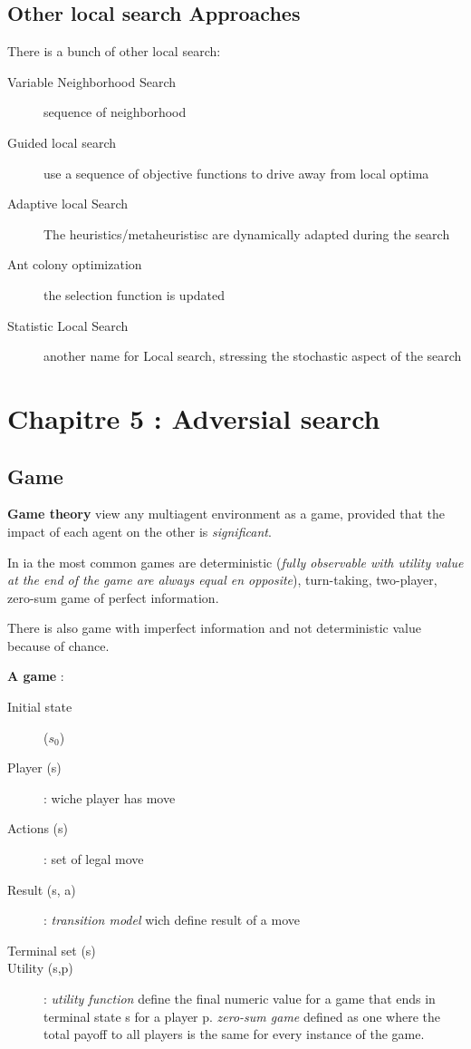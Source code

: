 \subsection{Other local search Approaches}

There is a bunch of other local search:
\begin{description}
    \item[Variable Neighborhood Search] sequence of neighborhood
    \item[Guided local search] use a sequence of objective functions to drive away from local optima
    \item[Adaptive local Search] The heuristics/metaheuristisc are dynamically adapted during the search
    \item[Ant colony optimization] the selection function is updated
    \item[Statistic Local Search] another name for Local search, stressing the stochastic aspect of the search
\end{description}



\section{Chapitre 5 : Adversial search}

\subsection{Game}

\textbf{Game theory} view any multiagent environment as a game, provided that
the impact of each agent on the other is \textit{significant}.

In ia the most common games are deterministic (\textit{fully observable with utility value at
the end of the game are always equal en opposite}), turn-taking, two-player, zero-sum game of
perfect information.

There is also game with imperfect information and not deterministic value because of chance.


\textbf{A game} :
\begin{description}
    \item[Initial state] ($s_0$)
    \item[Player (s)] : wiche player has move
    \item[Actions (s)] : set of legal move
    \item[Result (s, a)] : \textit{transition model} wich define result of a move
    \item[Terminal set (s)] 
    \item[Utility (s,p)] : \textit{utility function} define the final numeric value for a game that ends in terminal state s for a player p.
        \textit{zero-sum game} defined as one where the total payoff to all players is the same for every instance of the game.
\end{description}

